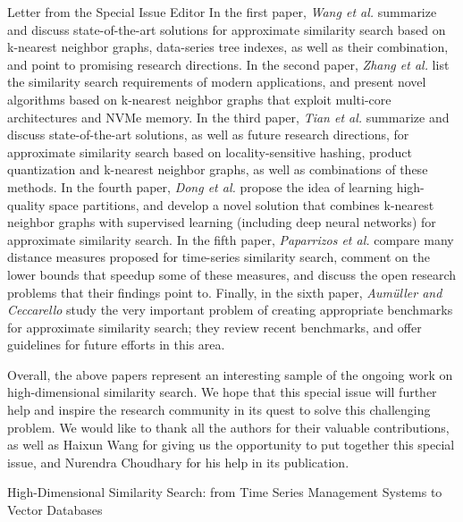 \documentclass[11pt]{article}
\begin{document}
\begin{bulletin}
\begin{lettersection}
\begin{letter}{Letter from the Special Issue Editor}
In the first paper, \emph{Wang et al.} summarize and discuss state-of-the-art solutions for approximate similarity search based on k-nearest neighbor graphs, data-series tree indexes, as well as their combination, and point to promising research directions.
In the second paper, \emph{Zhang et al.} list the similarity search requirements of modern applications, and present novel algorithms based on k-nearest neighbor graphs that exploit multi-core architectures and NVMe memory.
In the third paper, \emph{Tian et al.} summarize and discuss state-of-the-art solutions, as well as future research directions, for approximate similarity search based on locality-sensitive hashing, product quantization and k-nearest neighbor graphs, as well as combinations of these methods.
In the fourth paper, \emph{Dong et al.} propose the idea of learning high-quality space partitions, and develop a novel solution that combines k-nearest neighbor graphs with supervised learning (including deep neural networks) for approximate similarity search.
In the fifth paper, \emph{Paparrizos et al.} compare many distance measures proposed for time-series similarity search, comment on the lower bounds that speedup some of these measures, and discuss the open research problems that their findings point to. 
Finally, in the sixth paper, \emph{Aum\"{u}ller and Ceccarello} study the very important problem of creating appropriate benchmarks for approximate similarity search; they review recent benchmarks, and offer guidelines for future efforts in this area.

Overall, the above papers represent an interesting sample of the ongoing work on high-dimensional similarity search. 
We hope that this special issue will further help and inspire the research community in its quest to solve this challenging problem.
We would like to thank all the authors for their valuable contributions, as well as Haixun Wang for giving us the opportunity to put together this special issue, and Nurendra Choudhary for his help in its publication.

\end{letter}

\newpage

\end{lettersection}
  
\begin{articlesection}{High-Dimensional Similarity Search: from Time Series Management Systems to Vector Databases}
%
%


\end{articlesection}
\end{bulletin}
\end{document}
